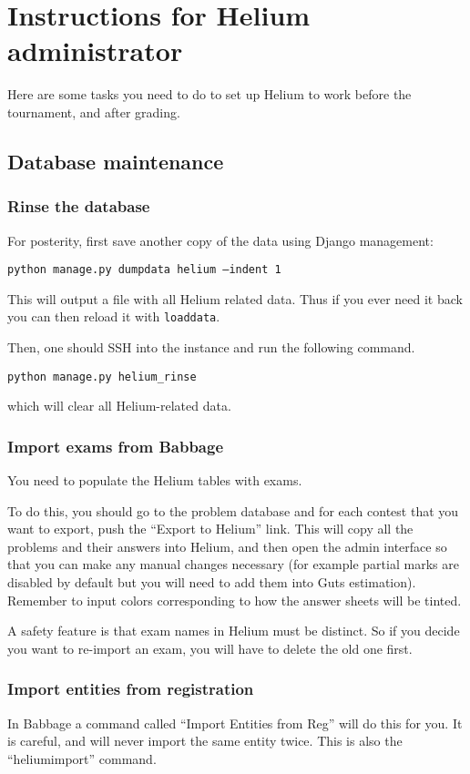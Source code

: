\chapter{Instructions for Helium administrator}
Here are some tasks you need to do to set up Helium
to work before the tournament, and after grading.

\section{Database maintenance}
\subsection{Rinse the database}
For posterity, first save another copy of the data using Django management:
\begin{center}
	\texttt{python manage.py dumpdata helium --indent 1}
\end{center}
This will output a file with all Helium related data.
Thus if you ever need it back you can then reload it with \texttt{loaddata}.

Then, one should SSH into the instance and run the following command.
\begin{center}
	\texttt{python manage.py helium\_rinse}
\end{center}
which will clear all Helium-related data.

\subsection{Import exams from Babbage}
You need to populate the Helium tables with exams.

To do this, you should go to the problem database and for each contest
that you want to export, push the ``Export to Helium'' link.
This will copy all the problems and their answers into Helium,
and then open the admin interface
so that you can make any manual changes necessary
(for example partial marks are disabled by default
but you will need to add them into Guts estimation).
Remember to input colors corresponding to how the answer sheets will be tinted.

A safety feature is that exam names in Helium must be distinct.
So if you decide you want to re-import an exam,
you will have to delete the old one first.

\subsection{Import entities from registration}
In Babbage a command called ``Import Entities from Reg'' will do this for you.
It is careful, and will never import the same entity twice.
This is also the ``heliumimport'' command.

